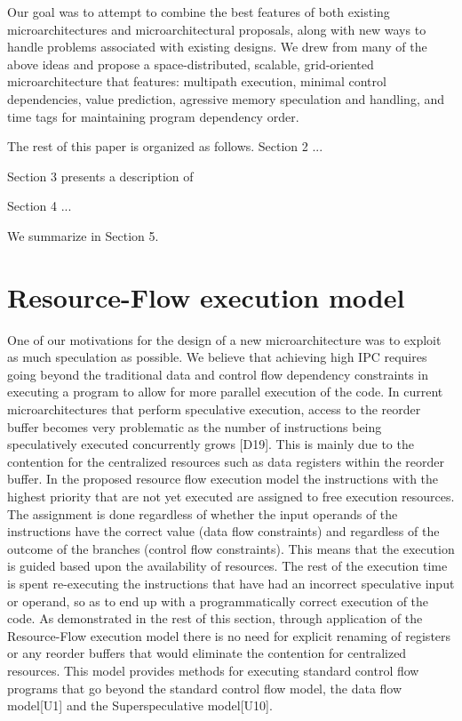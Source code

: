 \documentclass[10pt,twocolumn]{IEEEtran}
\begin{document}
Our goal was to attempt to combine the best features of
both existing microarchitectures and microarchitectural proposals,
along with new ways to handle problems associated with existing
designs.
We drew from many of the above ideas and propose a
space-distributed, scalable, grid-oriented microarchitecture
that features: multipath execution, minimal control
dependencies, value prediction, agressive memory speculation and
handling, and time tags for maintaining program dependency order.

The rest of this paper is organized
as follows.
Section 2  ...

Section 3 presents a description of 

Section 4  ...

We summarize in Section 5.
%


\section{Resource-Flow execution model}

One of our motivations for the design of a new microarchitecture was to
exploit as much speculation as possible.  We believe that achieving
high IPC requires going beyond the traditional data and control flow
dependency constraints in executing a program to allow for more
parallel execution of the code.  In current microarchitectures that
perform speculative execution, access to the reorder buffer becomes
very problematic as the number of instructions being speculatively
executed concurrently grows [D19].  This is mainly due to the
contention for the centralized resources such as data registers within
the reorder buffer.  In the proposed resource flow execution model the
instructions with the highest priority that are not yet executed are
assigned to free execution resources. The assignment is done regardless
of whether the input operands of the instructions have the correct
value (data flow constraints) and regardless of the outcome of the
branches (control flow constraints).  This means that the execution is guided
based upon the availability of resources.  The rest of the execution
time is spent re-executing the instructions that have had an incorrect
speculative input or operand, so as to end up with a programmatically
correct execution of the code.  As demonstrated in the rest of this
section, through application of the Resource-Flow execution model there
is no need for explicit renaming of registers or any reorder buffers
that would eliminate the contention for centralized resources.  This
model provides methods for executing standard control flow  programs
that go beyond the standard control flow model, the data flow model[U1]
and the Superspeculative model[U10].
\end{document}
